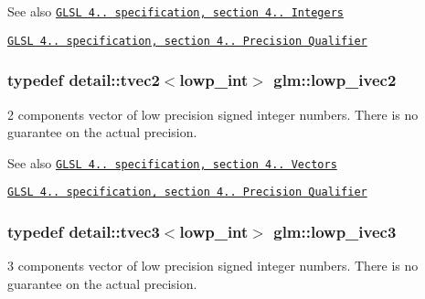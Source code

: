 \begin{DoxySeeAlso}{\-See also}
\href{http://www.opengl.org/registry/doc/GLSLangSpec.4.20.8.pdf}{\tt \-G\-L\-S\-L 4.. specification, section 4.. \-Integers} 

\href{http://www.opengl.org/registry/doc/GLSLangSpec.4.20.8.pdf}{\tt \-G\-L\-S\-L 4.. specification, section 4.. \-Precision \-Qualifier} 
\end{DoxySeeAlso}
\hypertarget{group__core__precision_ga5e59209b39a7d334f8b4bad8c01ea045}{
\subsubsection[{lowp\-\_\-ivec2}]{\setlength{\rightskip}{0pt plus 5cm}typedef detail\-::tvec2$<$lowp\-\_\-int$>$ {\bf glm\-::lowp\-\_\-ivec2}}}\label{group__core__precision_ga5e59209b39a7d334f8b4bad8c01ea045}
2 components vector of low precision signed integer numbers. \-There is no guarantee on the actual precision.

\begin{DoxySeeAlso}{\-See also}
\href{http://www.opengl.org/registry/doc/GLSLangSpec.4.20.8.pdf}{\tt \-G\-L\-S\-L 4.. specification, section 4.. \-Vectors} 

\href{http://www.opengl.org/registry/doc/GLSLangSpec.4.20.8.pdf}{\tt \-G\-L\-S\-L 4.. specification, section 4.. \-Precision \-Qualifier} 
\end{DoxySeeAlso}
\hypertarget{group__core__precision_ga61fed1e59be72903080596ebbaf2fac5}{
\subsubsection[{lowp\-\_\-ivec3}]{\setlength{\rightskip}{0pt plus 5cm}typedef detail\-::tvec3$<$lowp\-\_\-int$>$ {\bf glm\-::lowp\-\_\-ivec3}}}\label{group__core__precision_ga61fed1e59be72903080596ebbaf2fac5}
3 components vector of low precision signed integer numbers. \-There is no guarantee on the actual precision.

